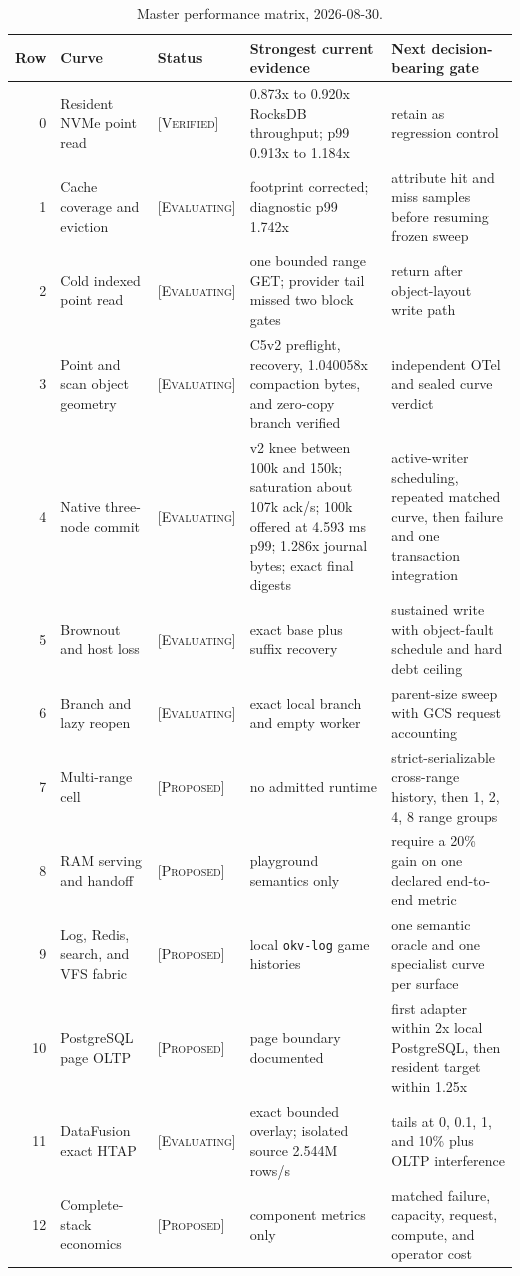 \documentclass[sigconf,nonacm]{acmart}
\newcommand{\verified}{\textsc{[Verified]}}
\newcommand{\evaluating}{\textsc{[Evaluating]}}
\newcommand{\proposed}{\textsc{[Proposed]}}
\begin{document}
\begin{table}[t]
  \centering
  \scriptsize
  \caption{Master performance matrix, 2026-08-30.}
  \label{tab:matrix}
  \begin{tabularx}{\textwidth}{@{}r p{}p{}X X@{}}
    \toprule
    Row & Curve & Status & Strongest current evidence & Next decision-bearing gate \\
    \midrule
    0 & Resident NVMe point read & \verified & 0.873x to 0.920x RocksDB
    throughput; p99 0.913x to 1.184x & retain as regression control \\
    1 & Cache coverage and eviction & \evaluating & footprint corrected; diagnostic
    p99 1.742x & attribute hit and miss samples before resuming frozen sweep \\
    2 & Cold indexed point read & \evaluating & one bounded range GET; provider tail
    missed two block gates & return after object-layout write path \\
    3 & Point and scan object geometry & \evaluating & C5v2 preflight, recovery,
    1.040058x compaction bytes, and zero-copy branch verified & independent OTel
    and sealed curve verdict \\
    4 & Native three-node commit & \evaluating & v2 knee between 100k and 150k;
    saturation about 107k ack/s; 100k offered at 4.593 ms p99; 1.286x journal
    bytes; exact final digests & active-writer scheduling, repeated matched
    curve, then failure and one transaction integration \\
    5 & Brownout and host loss & \evaluating & exact base plus suffix recovery &
    sustained write with object-fault schedule and hard debt ceiling \\
    6 & Branch and lazy reopen & \evaluating & exact local branch and empty worker &
    parent-size sweep with GCS request accounting \\
    7 & Multi-range cell & \proposed & no admitted runtime & strict-serializable
    cross-range history, then 1, 2, 4, 8 range groups \\
    8 & RAM serving and handoff & \proposed & playground semantics only & require a
    20\% gain on one declared end-to-end metric \\
    9 & Log, Redis, search, and VFS fabric & \proposed & local \texttt{okv-log}
    game histories & one semantic oracle and one specialist curve per surface \\
    10 & PostgreSQL page OLTP & \proposed & page boundary documented & first adapter
    within 2x local PostgreSQL, then resident target within 1.25x \\
    11 & DataFusion exact HTAP & \evaluating & exact bounded overlay; isolated source
    2.544M rows/s & tails at 0, 0.1, 1, and 10\% plus OLTP interference \\
    12 & Complete-stack economics & \proposed & component metrics only & matched
    failure, capacity, request, compute, and operator cost \\
    \bottomrule
  \end{tabularx}
\end{table}
\end{document}
